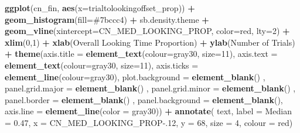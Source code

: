 \documentclass[
  doc,floatsintext]{apa6}
\newenvironment{Shaded}{\begin{snugshade}}{\end{snugshade}}
\newcommand{\AttributeTok}[1]{\textcolor[rgb]{0.13,0.29,0.53}{#1}}
\newcommand{\DecValTok}[1]{\textcolor[rgb]{0.00,0.00,0.81}{#1}}
\newcommand{\FloatTok}[1]{\textcolor[rgb]{0.00,0.00,0.81}{#1}}
\newcommand{\FunctionTok}[1]{\textcolor[rgb]{0.13,0.29,0.53}{\textbf{#1}}}
\newcommand{\NormalTok}[1]{#1}
\newcommand{\SpecialCharTok}[1]{\textcolor[rgb]{0.81,0.36,0.00}{\textbf{#1}}}
\newcommand{\StringTok}[1]{\textcolor[rgb]{0.31,0.60,0.02}{#1}}
\begin{document}
\begin{Shaded}
\begin{Highlighting}[]
\FunctionTok{ggplot}\NormalTok{(cn\_fin, }\FunctionTok{aes}\NormalTok{(}\AttributeTok{x=}\NormalTok{trialtolookingoffset\_prop)) }\SpecialCharTok{+}
  \FunctionTok{geom\_histogram}\NormalTok{(}\AttributeTok{fill=}\StringTok{\textquotesingle{}\#7bccc4\textquotesingle{}}\NormalTok{) }\SpecialCharTok{+}
\NormalTok{  sb.density.theme }\SpecialCharTok{+}
  \FunctionTok{geom\_vline}\NormalTok{(}\AttributeTok{xintercept=}\NormalTok{CN\_MED\_LOOKING\_PROP, }\AttributeTok{color=}\StringTok{\textquotesingle{}red\textquotesingle{}}\NormalTok{, }\AttributeTok{lty=}\DecValTok{2}\NormalTok{) }\SpecialCharTok{+}
  \FunctionTok{xlim}\NormalTok{(}\DecValTok{0}\NormalTok{,}\DecValTok{1}\NormalTok{) }\SpecialCharTok{+}
  \FunctionTok{xlab}\NormalTok{(}\StringTok{\textquotesingle{}Overall Looking Time Proportion\textquotesingle{}}\NormalTok{) }\SpecialCharTok{+}
  \FunctionTok{ylab}\NormalTok{(}\StringTok{\textquotesingle{}Number of Trials\textquotesingle{}}\NormalTok{) }\SpecialCharTok{+} 
  \FunctionTok{theme}\NormalTok{(}\AttributeTok{axis.title =} \FunctionTok{element\_text}\NormalTok{(}\AttributeTok{colour=}\StringTok{\textquotesingle{}gray30\textquotesingle{}}\NormalTok{, }\AttributeTok{size=}\DecValTok{11}\NormalTok{),}
        \AttributeTok{axis.text =} \FunctionTok{element\_text}\NormalTok{(}\AttributeTok{colour=}\StringTok{\textquotesingle{}gray30\textquotesingle{}}\NormalTok{, }\AttributeTok{size=}\DecValTok{11}\NormalTok{),}
        \AttributeTok{axis.ticks =} \FunctionTok{element\_line}\NormalTok{(}\AttributeTok{colour=}\StringTok{\textquotesingle{}gray30\textquotesingle{}}\NormalTok{),}
        \AttributeTok{plot.background =} \FunctionTok{element\_blank}\NormalTok{() ,}
        \AttributeTok{panel.grid.major =} \FunctionTok{element\_blank}\NormalTok{() ,}
        \AttributeTok{panel.grid.minor =} \FunctionTok{element\_blank}\NormalTok{() ,}
        \AttributeTok{panel.border =} \FunctionTok{element\_blank}\NormalTok{() ,}
        \AttributeTok{panel.background =} \FunctionTok{element\_blank}\NormalTok{(),}
        \AttributeTok{axis.line =} \FunctionTok{element\_line}\NormalTok{(}\AttributeTok{color =} \StringTok{\textquotesingle{}gray30\textquotesingle{}}\NormalTok{)) }\SpecialCharTok{+}
  \FunctionTok{annotate}\NormalTok{(}
    \StringTok{\textquotesingle{}text\textquotesingle{}}\NormalTok{, }\AttributeTok{label =} \StringTok{\textquotesingle{}Median = 0.47\textquotesingle{}}\NormalTok{,}
    \AttributeTok{x =}\NormalTok{ CN\_MED\_LOOKING\_PROP}\FloatTok{{-}.12}\NormalTok{, }\AttributeTok{y =} \DecValTok{68}\NormalTok{, }\AttributeTok{size =} \DecValTok{4}\NormalTok{, }\AttributeTok{colour =} \StringTok{\textquotesingle{}red\textquotesingle{}}\NormalTok{)}
\end{Highlighting}
\end{Shaded}
\end{document}
